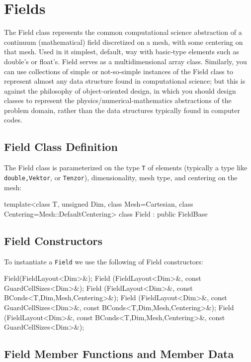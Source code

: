 \chapter{Fields}
\label{sec:fields}
The Field class represents the common computational science abstraction of a continuum (mathematical) field discretized on a mesh, 
with some centering on that mesh. Used in it simplest, default, way with basic-type elements such as double's or float's. Field serves as a 
multidimensional array class. Similarly, you can use collections of simple or not-so-simple instances of the Field class to represent almost any 
data structure found in computational science; but this is against the philosophy of object-oriented design, in which you should design classes 
to represent the physics/numerical-mathematics abstractions of the problem domain, rather than the data structures typically found in computer codes. 
\section{Field Class Definition}
The Field class is parameterized on the type  \texttt{T} of elements (typically a type like  \texttt{double,Vektor}, or \texttt{Tenzor}), dimensionality, mesh type, and centering on the mesh:
\begin{smallcode}
template<class T, unsigned Dim, 
                  class Mesh=Cartesian, 
                  class Centering=Mesh::DefaultCentering> 
class Field : public FieldBase 
\end{smallcode}
\pagebreak
\section{Field Constructors}
To instantiate a \texttt{Field} we use the following of  Field constructors:
\begin{smallcode}
Field(FieldLayout<Dim>&); 
Field (FieldLayout<Dim>&, const GuardCellSizes<Dim>&); 
Field (FieldLayout<Dim>&, const BConds<T,Dim,Mesh,Centering>&); 
Field (FieldLayout<Dim>&, const GuardCellSizes<Dim>&, 
			const BConds<T,Dim,Mesh,Centering>&); 
Field (FieldLayout<Dim>&, const BConds<T,Dim,Mesh,Centering>&, 
			const GuardCellSizes<Dim>&); 
\end{smallcode}
\section{Field Member Functions and Member Data}

